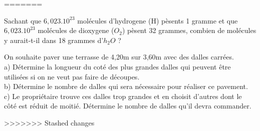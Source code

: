 =======
\newpage
\begin{exercise}[points=3]
Sachant que $6,023.10^{23}$ molécules d'hydrogene (H) pèsents 1 gramme
et que $6,023.10^{23}$ molécules de dioxygene ($O_2$) pèsent 32 grammes, 
combien de molécules y aurait-t-il dans 18 grammes d'$h_2O$ ?
    
\end{exercise}
\vspace*{4cm}
\begin{exercise}[points=3]
    On souhaite paver une terrasse de 4,20m sur 3,60m avec des dalles carrées.\\
    a) Détermine la longueur du coté des plus grandes dalles qui peuvent être utilisées si on ne veut pas faire de découpes.\\
    b) Détermine le nombre de dalles qui sera nécessaire pour réaliser ce pavement.\\
    c) Le propriétaire trouve ces dalles trop grandes et en choisit d'autres dont le côté est réduit de moitié.
    Détermine le nombre de dalles qu'il devra commander.
\end{exercise}
>>>>>>> Stashed changes
